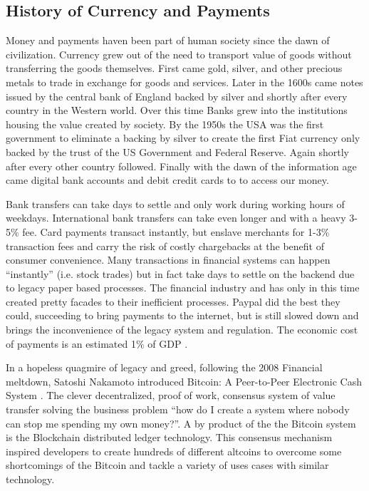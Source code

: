 \documentclass[12pt]{article} %
\begin{document}
\subsection{History of Currency and Payments}
Money and payments haven been part of human society since the dawn of civilization. Currency grew out of the need to transport value of goods without transferring the goods themselves. First came gold, silver, and other precious metals to trade in exchange for goods and services. Later in the 1600s came notes issued by the central bank of England backed by silver and shortly after every country in the Western world. Over this time Banks grew into the institutions housing the value created by society. By the 1950s the USA was the first government to eliminate a backing by silver to create the first Fiat currency only backed by the trust of the US Government and Federal Reserve. Again shortly after every other country followed. Finally with the dawn of the information age came digital bank accounts and debit credit cards to to access our money. 

Bank transfers can take days to settle and only work during working hours of weekdays. International bank transfers can take even longer and with a heavy 3-5\% fee. Card payments transact instantly, but enslave merchants for 1-3\% transaction fees and carry the risk of costly chargebacks at the benefit of consumer convenience. Many transactions in financial systems can happen ``instantly'' (i.e. stock trades) but in fact take days to settle on the backend due to legacy paper based processes. The financial industry and has only in this time created pretty facades to their inefficient processes. Paypal did the best they could, succeeding to bring payments to the internet, but is still slowed down and brings the inconvenience of the legacy system and regulation. The economic cost of payments is an estimated 1\% of GDP .

In a hopeless quagmire of legacy and greed, following the 2008 Financial meltdown, Satoshi Nakamoto introduced Bitcoin: A Peer-to-Peer Electronic Cash System . The clever decentralized, proof of work, consensus system of value transfer solving the business problem ``how do I create a system where nobody can stop me spending my own money?''. A by product of the the Bitcoin system is the Blockchain distributed ledger technology. This consensus mechanism inspired developers to create hundreds of different altcoins to overcome some shortcomings of the Bitcoin and tackle a variety of uses cases with similar technology.
\end{document}
